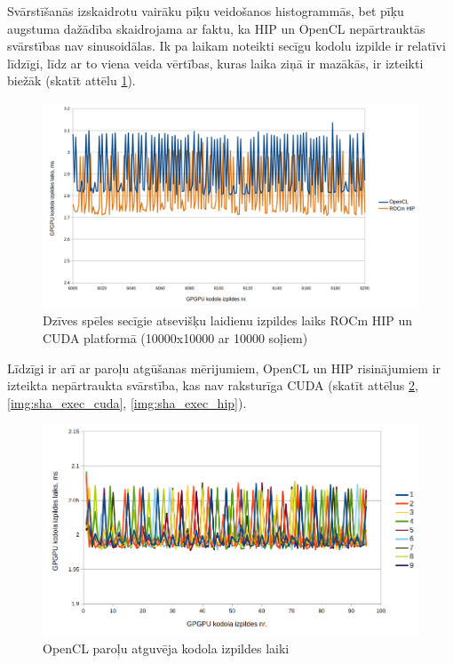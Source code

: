 Svārstīšanās izskaidrotu vairāku pīķu veidošanos histogrammās, bet pīķu
augstuma dažādība skaidrojama ar faktu, ka HIP un OpenCL nepārtrauktās
svārstības nav sinusoidālas. Ik pa laikam noteikti secīgu kodolu izpilde
ir relatīvi līdzīgi, līdz ar to viena veida vērtības, kuras laika ziņā ir
mazākās, ir izteikti biežāk (skatīt attēlu
\ref{img:consecutive_kernel_exec_gol_hip_cl_sample}).

\begin{figure}[H] \centering
    \includegraphics[width=\textwidth]{images/gol_hip_cl_sample_consecutive_runs_10k_by_10k_10ksteps.png}
    \caption{Dzīves spēles secīgie atsevišķu laidienu izpildes laiks ROCm HIP un CUDA
    platformā (10000x10000 ar 10000 soļiem)}
    \label{img:consecutive_kernel_exec_gol_hip_cl_sample}
\end{figure}

Līdzīgi ir arī ar paroļu atgūšanas mērijumiem, OpenCL un HIP risinājumiem ir
izteikta nepārtraukta svārstība, kas nav raksturīga CUDA (skatīt attēlus
\ref{img:sha_exec_cl}, \ref{img:sha_exec_cuda}, \ref{img:sha_exec_hip}).

\begin{figure}[H] \centering
    \includegraphics[width=\textwidth]{images/sha_kernel_exec_cl.png}
    \caption{OpenCL paroļu atguvēja kodola izpildes laiki}
    \label{img:sha_exec_cl}
\end{figure}

